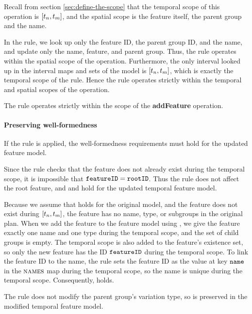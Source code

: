 Recall from section \vref{sec:define-the-scope} that the temporal scope of this operation is $\interval{t_n}{t_m}$, and the spatial scope is the feature itself, the parent group and the name. 

In the rule, we look up only the feature ID, the parent group ID, and the name, and update only the name, feature, and parent group. Thus, the rule operates within the spatial scope of the operation. Furthermore, the only interval looked up in the interval maps and sets of the model is $\interval{t_n}{t_m}$, which is exactly the temporal scope of the rule. Hence the rule operates strictly within the temporal and spatial scopes of the operation.
\\

\begin{lemma}
   The  rule operates strictly within the scope of the \textbf{addFeature} operation.
   \label{lemma:add-feature-scope}
\end{lemma}


\paragraph{Preserving well-formedness}

If the rule is applied, the well-formedness requirements must hold for the updated feature model. 

Since the rule checks that the feature does not already exist during the temporal scope, it is impossible that $\texttt{featureID} = \texttt{rootID}$. Thus the rule does not affect the root feature, and  and  hold for the updated temporal feature model.

Because we assume that  holds for the original model, and the feature does not exist during $\interval{t_n}{t_m}$, the feature has no name, type, or subgroups in the original plan. When we add the feature to the feature model using , we give the feature exactly one name and one type during the temporal scope, and the set of child groups is empty. The temporal scope is also added to the feature's existence set, so only the new feature has the ID $\texttt{featureID}$ during the temporal scope. To link the feature ID to the name, the rule sets the feature ID as the value at key $\texttt{name}$ in the $\textsc{names}{}$ map during the temporal scope, so the name is unique during the temporal scope.
Consequently,  holds.

The rule does not modify the parent group's variation type, so  is preserved in the modified temporal feature model.

